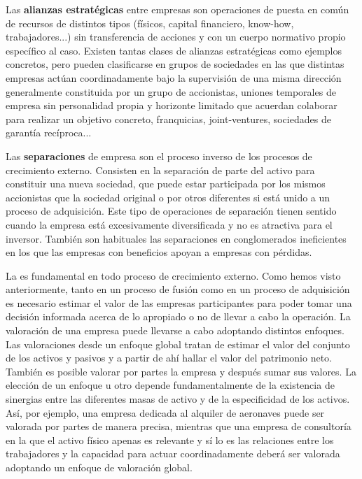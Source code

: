 \documentclass{nuevotema}
\begin{document}
Las \textbf{alianzas estratégicas} entre empresas son operaciones de puesta en común de recursos de distintos tipos (físicos, capital financiero, know-how, trabajadores...) sin transferencia de acciones y con un cuerpo normativo propio específico al caso. Existen tantas clases de alianzas estratégicas como ejemplos concretos, pero pueden clasificarse en grupos de sociedades en las que distintas empresas actúan coordinadamente bajo la supervisión de una misma dirección generalmente constituida por un grupo de accionistas, uniones temporales de empresa sin personalidad propia y horizonte limitado que acuerdan colaborar para realizar un objetivo concreto, franquicias, joint-ventures, sociedades de garantía recíproca...

Las \textbf{separaciones} de empresa son el proceso inverso de los procesos de crecimiento externo. Consisten en la separación de parte del activo para constituir una nueva sociedad, que puede estar participada por los mismos accionistas que la sociedad original o por otros diferentes si está unido a un proceso de adquisición. Este tipo de operaciones de separación tienen sentido cuando la empresa está excesivamente diversificada y no es atractiva para el inversor. También son habituales las separaciones en conglomerados ineficientes en los que las empresas con beneficios apoyan a empresas con pérdidas. 

La  es fundamental en todo proceso de crecimiento externo. Como hemos visto anteriormente, tanto en un proceso de fusión como en un proceso de adquisición es necesario estimar el valor de las empresas participantes para poder tomar una decisión informada acerca de lo apropiado o no de llevar a cabo la operación. La valoración de una empresa puede llevarse a cabo adoptando distintos enfoques. Las valoraciones desde un enfoque global tratan de estimar el valor del conjunto de los activos y pasivos y a partir de ahí hallar el valor del patrimonio neto. También es posible valorar por partes la empresa y después sumar sus valores. La elección de un enfoque u otro depende fundamentalmente de la existencia de sinergias entre las diferentes masas de activo y de la especificidad de los activos. Así, por ejemplo, una empresa dedicada al alquiler de aeronaves puede ser valorada por partes de manera precisa, mientras que una empresa de consultoría en la que el activo físico apenas es relevante y sí lo es las relaciones entre los trabajadores y la capacidad para actuar coordinadamente deberá ser valorada adoptando un enfoque de valoración global. 
\end{document}
